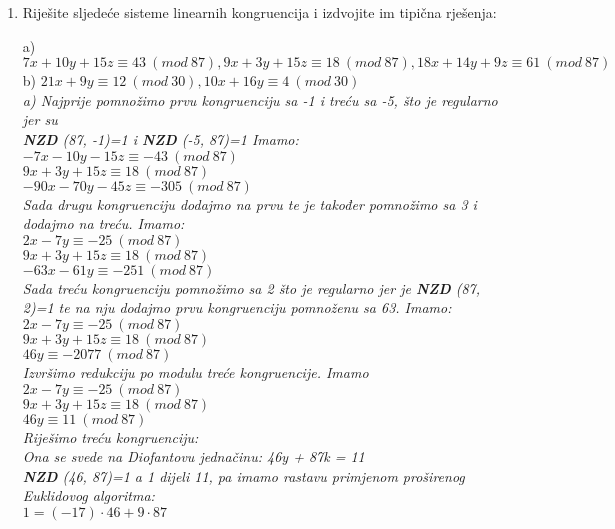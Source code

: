 \documentclass[12pt]{article}
\begin{document}
\begin{enumerate}
\begin{center}
\begin{lstlisting}
}
        \end{lstlisting}
	    \end{center}
	    \item Riješite sljedeće sisteme linearnih kongruencija i izdvojite im tipična rješenja:
        \begin{center}
        a)$ 7 x + 10 y + 15 z\equiv 43\ (mod\ 87), 9 x + 3 y + 15 z \equiv 18\ (mod\ 87), 18 x + 14 y + 9 z\equiv 61\ (mod\ 87)$\\
        b) $21 x + 9 y \equiv 12\ (mod\ 30), 10 x + 16 y \equiv 4\ (mod\ 30)$\\
        \vspace*{0.75cm}
        \textit{a) Najprije pomnožimo prvu kongruenciju sa -1 i treću sa -5, što je regularno jer su\\ \textbf{NZD} (87, -1)=1 i \textbf{NZD} (-5, 87)=1 Imamo:\\$-7x - 10y - 15z \equiv -43\ (mod\ 87)$\\ $9x + 3y + 15z \equiv 18\ (mod\ 87)$\\ $-90x - 70y -45z \equiv -305\ (mod\ 87)$\\}
        \vspace*{0.25cm}
        \textit{ Sada drugu kongruenciju dodajmo na prvu te je također pomnožimo sa 3 i dodajmo na treću. Imamo:\\$2x - 7y \equiv -25\ (mod\ 87)$\\ $9x + 3y + 15z \equiv 18\ (mod\ 87)$\\$-63x - 61y \equiv -251\ (mod\ 87)$\\}
        \vspace*{0.25cm}
        \textit{Sada treću kongruenciju pomnožimo sa 2 što je regularno jer je \textbf{NZD} (87, 2)=1 te na nju dodajmo prvu kongruenciju pomnoženu sa 63. Imamo:\\$2x - 7y \equiv -25\ (mod\ 87)$\\ $9x + 3y + 15z \equiv 18\ (mod\ 87)$\\$46y \equiv -2077\ (mod\ 87)$\\}
        \vspace*{0.25cm} 
        \textit{ Izvršimo redukciju po modulu treće kongruencije. Imamo\\$2x - 7y \equiv -25\ (mod\ 87)$\\$ 9x + 3y + 15z \equiv 18\ (mod\ 87)$\\$46y \equiv 11\ (mod\ 87)$\\}
        \vspace*{0.25cm} 
        \textit{Riješimo treću kongruenciju:\\Ona se svede na Diofantovu jednačinu: 46y + 87k = 11\\\textbf{NZD} (46, 87)=1 a 1 dijeli 11, pa imamo rastavu primjenom proširenog Euklidovog algoritma:\\$1 = (-17) \cdot 46 + 9 \cdot 87$\\}

\end{center}
\end{enumerate}
\end{document}
